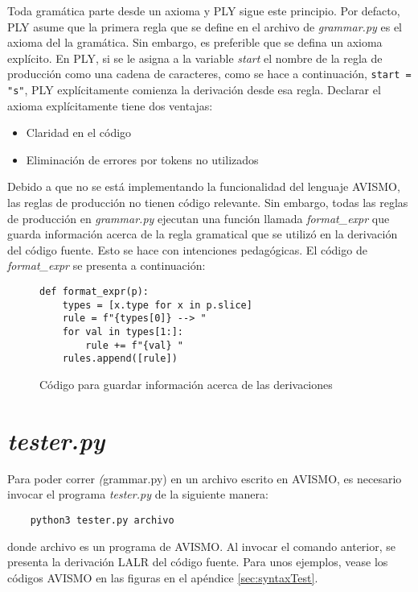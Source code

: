 Toda gramática parte desde un axioma y PLY sigue este principio.
Por defacto, PLY asume que la primera regla que se define en el archivo de \textit{grammar.py} es el axioma del la gramática.
Sin embargo, es preferible que se defina un axioma explícito.
En PLY, si se le asigna a la variable \textit{start} el nombre de la regla de producción como una cadena de caracteres, como se hace a continuación, \texttt{start = "s"}, PLY explícitamente comienza la derivación desde esa regla. Declarar el axioma explícitamente tiene dos ventajas:
\begin{itemize}
	\item Claridad en el código
	\item Eliminación de errores por tokens no utilizados
\end{itemize}

Debido a que no se está implementando la funcionalidad del lenguaje AVISMO, las reglas de producción no tienen código relevante. Sin embargo, todas las reglas de producción en \textit{grammar.py} ejecutan una función llamada \textit{format\_expr} que guarda información acerca de la regla gramatical que se utilizó en la derivación del código fuente.
Esto se hace con intenciones pedagógicas.
El código de \textit{format\_expr} se presenta a continuación:
\begin{figure}[H]
	\begin{verbatim}
def format_expr(p):
    types = [x.type for x in p.slice]
    rule = f"{types[0]} --> "
    for val in types[1:]:
        rule += f"{val} "
    rules.append([rule])
\end{verbatim}
	\caption{Código para guardar información acerca de las derivaciones}
	\label{fig: formatExpr}
\end{figure}

\section{\textit{tester.py}}

Para poder correr \textit(grammar.py) en un archivo escrito en AVISMO, es necesario invocar el programa \textit{tester.py} de la siguiente manera:
\begin{verbatim}
	python3 tester.py archivo
\end{verbatim}
donde archivo es un programa de AVISMO.
Al invocar el comando anterior, se presenta la derivación LALR del código fuente.
Para unos ejemplos, vease los códigos AVISMO en las figuras en el apéndice \ref{sec:syntaxTest}.



